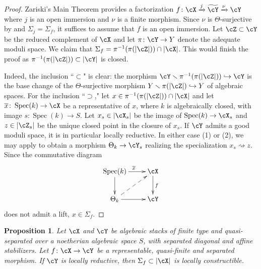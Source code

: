 \documentclass[a4paper]{amsart}
\numberwithin{equation}{section}
\theoremstyle{plain}
\newtheorem{prop}[thm]{Proposition}
\theoremstyle{definition}
\DeclareMathOperator{\Spec}{Spec}
\newcommand{\hookarr}{\hookrightarrow}
\newcommand{\co}{\colon}
\begin{document}
\begin{proof}
	Zariski's Main Theorem \cite[Thm.~16.5]{lmb} provides a factorization $f \co \cX \xrightarrow{j} \widetilde{\cY} \xrightarrow{\nu} \cY$ where $j$ is an open immersion and $\nu$ is a {finite} morphism.  Since $\nu$ is $\Theta$-surjective by  and $\Sigma_j = \Sigma_f$, it suffices to assume that $f$ is an open immersion.  Let $\cZ \subset \cY$ be the reduced complement of $\cX$  and let $\pi \co \cY \to Y$ denote the adequate moduli space.  We claim that $\Sigma_f = \pi^{-1} (\pi(|\cZ|)) \cap |\cX|$.  This would finish the proof as $\pi^{-1}(\pi(|\cZ|)) \subset |\cY|$ is closed.
	
	Indeed, the inclusion ``$\subset$" is clear:  the morphism $\cY \smallsetminus \pi^{-1} (\pi(|\cZ|)) \hookarr \cY$ is the base change of the $\Theta$-surjective morphism $Y \smallsetminus \pi(|\cZ|) \hookarr Y$ of algebraic spaces.  For the inclusion ``$\supset$," let $x \in \pi^{-1} (\pi(|\cZ|)) \cap |\cX|$ and let $\overline{x} \co \Spec(k) \to \cX$ be a representative of $x$, where $k$ is algebraically closed, with image $s \co \Spec(k) \to S$.   Let $x_s \in |\cX_s|$ be the image of $\Spec(k) \to \cX_s$ and $z \in |\cZ_s|$ be the unique closed point in the closure of $x_s$.  If $\cY$ admits a good moduli space, it is in particular locally reductive. In either case (1) or (2), we may apply   to obtain a morphism $\Theta_k \to \cY_s$ realizing the specialization $x_s \rightsquigarrow z$.  Since the commutative diagram
	$$\xymatrix{
		\Spec(k) \ar[r]^{\overline{x}} \ar[d]						& \cX \ar[d]^f 	\\
		\Theta_k \ar[r] \ar@{-->}[ur]					& \cY
	}$$
	does not admit a lift, $x \in \Sigma_f$. 
\end{proof}

\begin{prop} \label{P:sigma-constructible} 
Let $\cX$ and $\cY$ be algebraic stacks of finite {type and quasi-separated} over a {noetherian} algebraic space $S$, with separated diagonal and affine stabilizers. Let $f \co \cX \to \cY$ be a representable, quasi-finite and separated morphism. If $\cY$ is locally reductive, then $\Sigma_f \subset |\cX|$ is locally constructible.
\end{prop}
\end{document}
